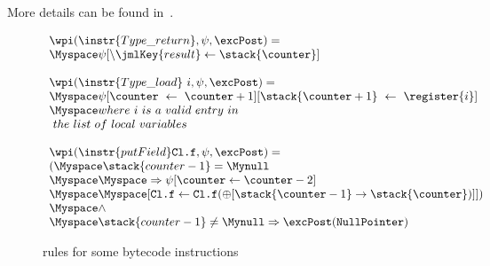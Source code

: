  More details can be found in~\cite{WPBC}.
\begin{figure}[ht]

$$
\begin{array}{l}
\wpi(\instr{Type\_return} , \psi, \excPost) =  \\
 \Myspace \psi[\backslash \jmlKey{result} \leftarrow \stack{\counter}] \\
\\
\wpi(\instr{Type\_load} \ i, \psi, \excPost) =  \\
\Myspace \psi[\counter \ \leftarrow \ \counter+1] [\stack{\counter+1} \ \leftarrow \ \register{i}] \\
 \Myspace where \ i \  is \ a \ valid \ entry \ in \\
 \ the \ list \  of \  local \ variables   \\
\\ 
\wpi(\instr{putField}\texttt{Cl.f}, \psi, \excPost) = \\
   ( \Myspace \stack{counter -1} = \Mynull \\
   \Myspace  \Myspace \Rightarrow \psi[\counter \leftarrow \counter-2 ] \\
   \Myspace  \Myspace [\texttt{Cl.f} \leftarrow \texttt{Cl.f}(\oplus [\stack{\counter - 1} \rightarrow \stack{\counter})] ] )\\
   \Myspace  \wedge  \\
   \Myspace  \stack{counter-1} \not= \Mynull \Rightarrow \excPost(\tt{NullPointer}) \\ 
 \end{array} $$



\caption{rules for some bytecode instructions}
\label{instrWP}
\end{figure}

